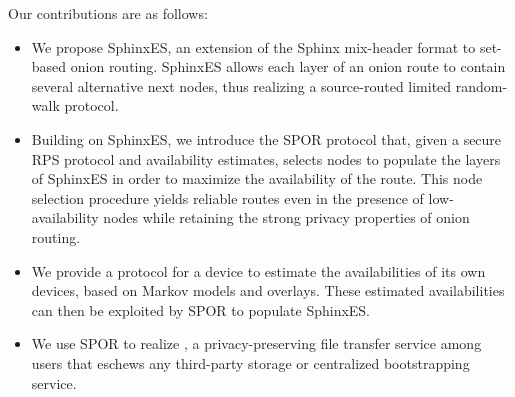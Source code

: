 Our contributions are as follows: 
\begin{itemize}


  \item We propose SphinxES, an extension of the
    \ac{Sphinx} mix-header format to set-based onion routing. SphinxES allows each layer of an onion route to contain several alternative next nodes, thus realizing a source-routed limited random-walk protocol.

  \item Building on SphinxES, we introduce the \ac{SPOR} %
    protocol
    that, given a secure 
    \ac{RPS} protocol and availability estimates, selects nodes to populate the 
    layers of SphinxES in order to maximize the availability of the route. This node selection procedure 
    yields reliable routes even in the presence of low-availability nodes while retaining the strong privacy properties of onion routing.

  \item We provide a protocol for a device \squad to estimate the availabilities 
    of its own devices, based on Markov models and \squad overlays.
    These estimated availabilities can then be exploited by \ac{SPOR} to populate SphinxES.

  \item We use \ac{SPOR} to realize \name,  a privacy-preserving file transfer service among
  users that eschews any third-party storage or centralized bootstrapping service.

\end{itemize}

